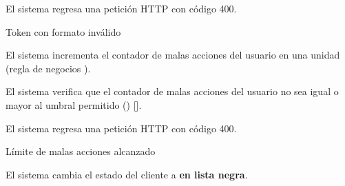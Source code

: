 {\begin{trayectoriaAlternativa}
    \item El sistema regresa una petición HTTP con código 400.

  \end{trayectoriaAlternativa}

  \begin{trayectoriaAlternativa}
    {Token con formato inválido}

    \item El sistema incrementa el contador de malas acciones del usuario
      en una unidad (regla de negocios ).
    \item El sistema verifica que el contador de malas acciones del usuario no
      sea igual o mayor al umbral permitido
      ()
      [].

    \item El sistema regresa una petición HTTP con código 400.

  \end{trayectoriaAlternativa}

  \begin{trayectoriaAlternativa}
    {Límite de malas acciones alcanzado}

    \item El sistema cambia el estado del cliente a \textbf{en lista negra}.

  \end{trayectoriaAlternativa}

}
